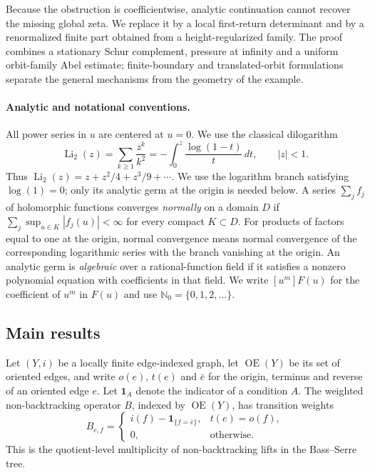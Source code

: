 \documentclass[11pt,reqno]{amsart}
\numberwithin{equation}{section}
\theoremstyle{definition}
\theoremstyle{remark}
\newcommand{\OrE}{\operatorname{OE}}
\newcommand{\one}{\mathbf 1}
\newcommand{\Li}{\operatorname{Li}_2}
\begin{document}
Because the obstruction is coefficientwise, analytic continuation cannot
recover the missing global zeta.  We replace it by a local first-return
determinant and by a renormalized finite part obtained from a height-regularized
family.  The proof combines a stationary Schur complement, pressure at
infinity and a uniform orbit-family Abel estimate; finite-boundary and
translated-orbit formulations separate the general mechanisms from the
geometry of the example.

\paragraph{Analytic and notational conventions.}
All power series in $u$ are centered at $u=0$.  We use the classical
dilogarithm
\begin{equation}\label{eq:dilog-definition}
 \Li(z)=\sum_{k\ge1}\frac{z^k}{k^2}
 =-\int_0^z\frac{\log(1-t)}{t}\,dt,
 \qquad |z|<1.
\end{equation}
Thus $\Li(z)=z+z^2/4+z^3/9+\cdots$.  We use the logarithm branch satisfying
$\log(1)=0$; only its analytic germ at
the origin is needed below.  A series $\sum_j f_j$ of holomorphic functions
converges \emph{normally} on a domain $D$ if
$\sum_j\sup_{u\in K}|f_j(u)|<\infty$ for every compact $K\subset D$.
For products of factors equal to one at the origin, normal convergence means
normal convergence of the corresponding logarithmic series with the branch
vanishing at the origin.
An analytic germ is \emph{algebraic} over a rational-function field if it
satisfies a nonzero polynomial equation with coefficients in that field.  We
write $[u^m]F(u)$ for the coefficient of $u^m$ in $F(u)$ and use
$\mathbb N_0=\{0,1,2,\ldots\}$.

\subsection{Main results}

Let $(Y,i)$ be a locally finite edge-indexed graph, let $\OrE(Y)$ be its set of
oriented edges, and write $o(e)$, $t(e)$ and $\bar e$ for the origin, terminus
and reverse of an oriented edge $e$.  Let $\one_A$ denote the indicator of a
condition $A$.  The weighted non-backtracking operator $B$, indexed by
$\OrE(Y)$, has transition weights
\[
 B_{e,f}=\begin{cases}
 i(f)-\one_{\{f=\bar e\}},&t(e)=o(f),\\
 0,&\text{otherwise}.
 \end{cases}
\]
This is the quotient-level multiplicity of non-backtracking lifts in the
Bass--Serre tree.
\end{document}
